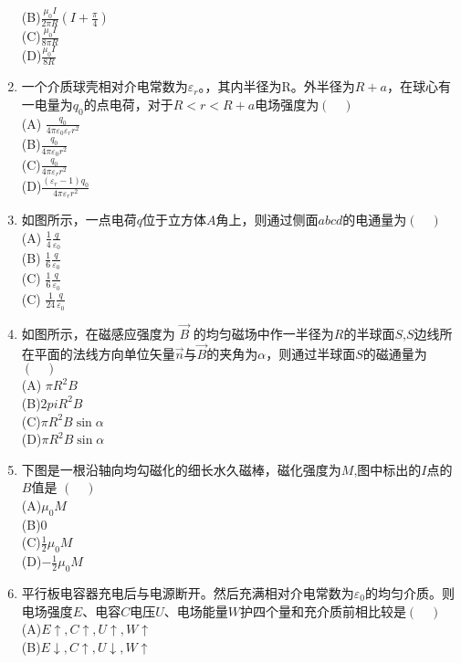 \begin{enumerate}
(B)$\displaystyle \frac{\mu_0 I}{2\pi R}(I+\frac{\pi}{4})$\\
(C)$\displaystyle \frac{\mu_0 I}{8 \pi R}$\\
(D)$\displaystyle \frac{\mu_0 I}{8R}$
\item 一个介质球壳相对介电常数为$\varepsilon_r$。，其内半径为R。外半径为$R+a$，在球心有一电量为$q_0$的点电荷，对于$R<r<R+a$电场强度为$(\quad)$\\
(A) $\displaystyle \frac{q_0}{4\pi \varepsilon_0 \varepsilon_r r^2}$\\
(B)$\displaystyle \frac{q_0}{4\pi \varepsilon_0  r^2}$\\
(C)$\displaystyle \frac{q_0}{4\pi \varepsilon_r  r^2}$\\
(D)$\displaystyle \frac{(\varepsilon_r-1)q_0}{4\pi \varepsilon_r  r^2}$
\item 如图所示，一点电荷$q$位于立方体$A$角上，则通过侧面$abcd$的电通量为$(\quad)$\\
(A) $\displaystyle \frac{1}{4} \frac{q}{\varepsilon_0}$\\
(B) $\displaystyle \frac{1}{6} \frac{q}{\varepsilon_0}$\\
(C) $\displaystyle \frac{1}{6} \frac{q}{\varepsilon_0}$\\
(C) $\displaystyle \frac{1}{24} \frac{q}{\varepsilon_0}$
\item 如图所示，在磁感应强度为 $\vec B$ 的均匀磁场中作一半径为$R$的半球面$S$,$S$边线所在平面的法线方向单位矢量$\vec n$与$\vec B$的夹角为$\alpha$，则通过半球面$S$的磁通量为$(\quad)$\\
(A) $\pi R^2 B$\\
(B)$2pi R^2 B$\\
(C)$\pi R^2 B \sin \alpha$\\
(D)$\pi R^2 B \sin \alpha$
\item 下图是一根沿轴向均勾磁化的细长水久磁棒，磁化强度为$M$,图中标出的$I$点的$B$值是
$(\quad)$\\
(A)$\mu_0 M$\\
(B)0\\
(C)$\displaystyle \frac{1}{2} \mu_0 M$ \\
(D)$\displaystyle -\frac{1}{2} \mu_0 M$ 
\item 平行板电容器充电后与电源断开。然后充满相对介电常数为$\varepsilon_0$的均匀介质。则电场强度$E$、电容$C$电压$U$、电场能量$W$护四个量和充介质前相比较是$(\quad)$\\
(A)$E \uparrow ,C\uparrow ,U\uparrow ,W\uparrow$\\
(B)$E \downarrow ,C\uparrow ,U\downarrow  ,W\uparrow$\\

\end{enumerate}
